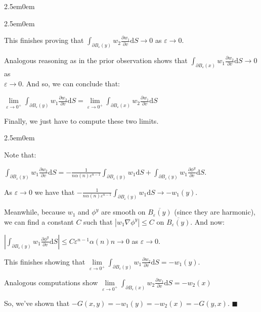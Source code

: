 \documentclass{book}
\newcommand{\exPPP}{%
   \color{VioletRed}%
   \fontsize{12}{14}\selectfont%
}
\newenvironment{myIndent}{%
   \begin{adjustwidth}{2.5em}{0em}%
}{%
   \end{adjustwidth}%
}
\newcommand{\df}{\mathrm{d}}
\newcommand{\retTwo}{\hfill\bigbreak}
\begin{document}
\begin{myIndent}
\begin{myIndent}
		This finishes proving that $\int_{\partial B_\varepsilon(y)}  w_2 \frac{\partial w_1}{\partial v}\df S \to 0$ as $\varepsilon \to 0$.\retTwo
	\end{myIndent}

	Analogous reasoning as in the prior observation shows that $\int_{\partial B_\varepsilon(x)} w_1 \frac{\partial w_2}{\partial v} \df S \to 0$ as\\ $\varepsilon \to 0$. And so, we can conclude that:

	{\centering $\lim\limits_{\varepsilon \to 0^+}\int_{\partial B_\varepsilon(y)}w_1 \frac{\partial w_2}{\partial v}\df S = \lim\limits_{\varepsilon \to 0^+} \int_{\partial B_\varepsilon(x)} w_2 \frac{\partial w_1}{\partial v}\df S$ \retTwo\par}

	Finally, we just have to compute these two limits.
	\begin{myIndent}\exPPP
		Note that:
		
		{\centering$\int_{\partial B_\varepsilon(y)}w_1 \frac{\partial w_2}{\partial v}\df S = -\frac{1}{n\alpha(n)\varepsilon^{n-1}}\int_{\partial B_\varepsilon(y)}w_1 \df S + \int_{\partial B_\varepsilon(y)} w_1 \frac{\partial \phi^y}{\partial v} \df S$.\retTwo\par}

		As $\varepsilon \to 0$ we have that $-\frac{1}{n\alpha(n)\varepsilon^{n-1}}\int_{\partial B_\varepsilon(y)}w_1 \df S \to -w_1(y)$.\retTwo

		Meanwhile, because $w_1$ and $\phi^y$ are smooth on $\overline{B_\varepsilon(y)}$ (since they are harmonic), we can find a constant $C$ such that $|w_1 \nabla \phi^y| \leq C$ on $\overline{B_\varepsilon(y)}$. And now:

		{\centering $\left|\int_{\partial B_\varepsilon(y)} w_1 \frac{\partial \phi^y}{\partial v} \df S\right|  \leq C\varepsilon^{n-1}\alpha(n) n \to 0$ as $\varepsilon \to 0$.
		\retTwo\par}

		This finishes showing that $\lim\limits_{\varepsilon \to 0^+}\int_{\partial B_\varepsilon(y)}w_1 \frac{\partial w_2}{\partial v}\df S = -w_1(y)$.\retTwo

		Analogous computations show $\lim\limits_{\varepsilon \to 0^+} \int_{\partial B_\varepsilon(x)} w_2 \frac{\partial w_1}{\partial v}\df S = -w_2(x)$\retTwo
	\end{myIndent}

	So, we've shown that $-G(x, y) = -w_1(y) = -w_2(x) = -G(y, x)$. $\blacksquare$\retTwo
\end{myIndent}
\end{document}
